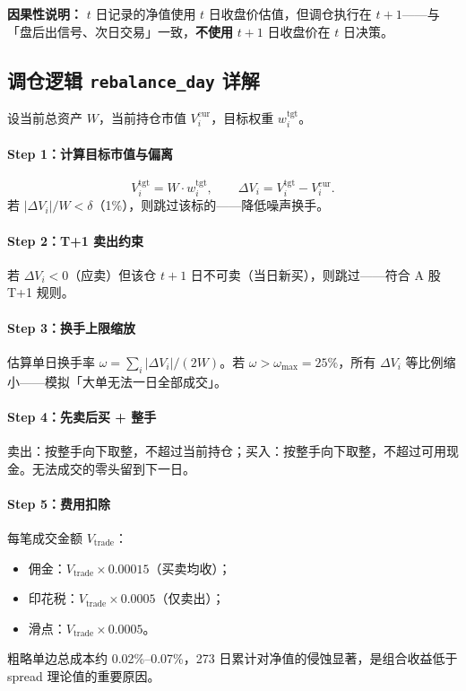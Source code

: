 \documentclass[UTF8,a4paper,12pt]{ctexart}
\begin{document}
\textbf{因果性说明：} $t$ 日记录的净值使用 $t$ 日收盘价估值，但调仓执行在 $t\!+\!1$——与「盘后出信号、次日交易」一致，\textbf{不使用} $t\!+\!1$ 日收盘价在 $t$ 日决策。

\subsection{调仓逻辑 \texttt{rebalance\_day} 详解}

设当前总资产 $W$，当前持仓市值 $V_i^{\mathrm{cur}}$，目标权重 $w_i^{\mathrm{tgt}}$。

\paragraph{Step 1：计算目标市值与偏离}

\begin{equation}
  V_i^{\mathrm{tgt}} = W \cdot w_i^{\mathrm{tgt}}, \qquad
  \Delta V_i = V_i^{\mathrm{tgt}} - V_i^{\mathrm{cur}}.
\end{equation}
若 $|\Delta V_i|/W < \delta$（1\%），则跳过该标的——降低噪声换手。

\paragraph{Step 2：T+1 卖出约束}

若 $\Delta V_i < 0$（应卖）但该仓 $t\!+\!1$ 日不可卖（当日新买），则跳过——符合 A 股 T+1 规则。

\paragraph{Step 3：换手上限缩放}

估算单日换手率 $\omega = \sum_i|\Delta V_i|/(2W)$。若 $\omega > \omega_{\max}=25\%$，所有 $\Delta V_i$ 等比例缩小——模拟「大单无法一日全部成交」。

\paragraph{Step 4：先卖后买 + 整手}

卖出：按整手向下取整，不超过当前持仓；买入：按整手向下取整，不超过可用现金。无法成交的零头留到下一日。

\paragraph{Step 5：费用扣除}

每笔成交金额 $V_{\mathrm{trade}}$：
\begin{itemize}[leftmargin=2em]
  \item 佣金：$V_{\mathrm{trade}}\times 0.00015$（买卖均收）；
  \item 印花税：$V_{\mathrm{trade}}\times 0.0005$（仅卖出）；
  \item 滑点：$V_{\mathrm{trade}}\times 0.0005$。
\end{itemize}
粗略单边总成本约 0.02\%--0.07\%，273 日累计对净值的侵蚀显著，是组合收益低于 spread 理论值的重要原因。
\end{document}
